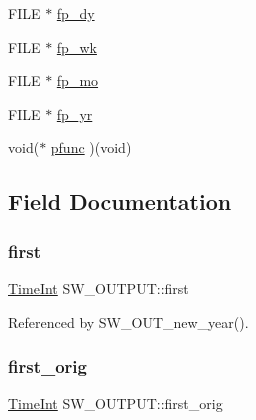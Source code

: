 \begin{DoxyCompactItemize}
\item 
F\+I\+LE $\ast$ \hyperlink{struct_s_w___o_u_t_p_u_t_aabb6232e4d83770f0d1c46010ade9dc5}{fp\+\_\+dy}
\item 
F\+I\+LE $\ast$ \hyperlink{struct_s_w___o_u_t_p_u_t_aedb850b7e2cdddec6788dec4ae3cb2b9}{fp\+\_\+wk}
\item 
F\+I\+LE $\ast$ \hyperlink{struct_s_w___o_u_t_p_u_t_a5269e635c4f1a5dfd8da16eed011563f}{fp\+\_\+mo}
\item 
F\+I\+LE $\ast$ \hyperlink{struct_s_w___o_u_t_p_u_t_a6deda2af703cfc6c41bf105534ae7656}{fp\+\_\+yr}
\item 
void($\ast$ \hyperlink{struct_s_w___o_u_t_p_u_t_a1b2e79aa8b30b491a7558244a42ef5b1}{pfunc} )(void)
\end{DoxyCompactItemize}


\subsection{Field Documentation}
\mbox{\label{struct_s_w___o_u_t_p_u_t_a9bfbb118c01c4f57f87d11fc53859756}} 
\subsubsection{\texorpdfstring{first}{first}}
{\footnotesize\ttfamily \hyperlink{_times_8h_a25ac787161a5cad0e3fdfe5a5aeb3236}{Time\+Int} S\+W\+\_\+\+O\+U\+T\+P\+U\+T\+::first}



Referenced by S\+W\+\_\+\+O\+U\+T\+\_\+new\+\_\+year().

\mbox{\label{struct_s_w___o_u_t_p_u_t_a28a2b9c7bfdb4e5a8078386212e91545}} 
\subsubsection{\texorpdfstring{first\+\_\+orig}{first\_orig}}
{\footnotesize\ttfamily \hyperlink{_times_8h_a25ac787161a5cad0e3fdfe5a5aeb3236}{Time\+Int} S\+W\+\_\+\+O\+U\+T\+P\+U\+T\+::first\+\_\+orig}



